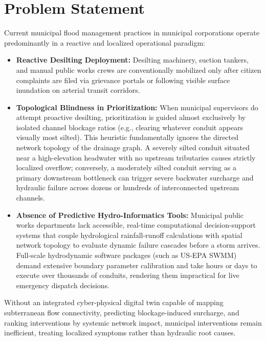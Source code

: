 \documentclass[12pt,a4paper]{report}
\begin{document}
\section{Problem Statement}
Current municipal flood management practices in municipal corporations operate predominantly in a reactive and localized operational paradigm:
\begin{itemize}
    \item \textbf{Reactive Desilting Deployment:} Desilting machinery, suction tankers, and manual public works crews are conventionally mobilized only after citizen complaints are filed via grievance portals or following visible surface inundation on arterial transit corridors.
    \item \textbf{Topological Blindness in Prioritization:} When municipal supervisors do attempt proactive desilting, prioritization is guided almost exclusively by isolated channel blockage ratios (e.g., clearing whatever conduit appears visually most silted). This heuristic fundamentally ignores the directed network topology of the drainage graph. A severely silted conduit situated near a high-elevation headwater with no upstream tributaries causes strictly localized overflow; conversely, a moderately silted conduit serving as a primary downstream bottleneck can trigger severe backwater surcharge and hydraulic failure across dozens or hundreds of interconnected upstream channels.
    \item \textbf{Absence of Predictive Hydro-Informatics Tools:} Municipal public works departments lack accessible, real-time computational decision-support systems that couple hydrological rainfall-runoff calculations with spatial network topology to evaluate dynamic failure cascades before a storm arrives. Full-scale hydrodynamic software packages (such as US-EPA SWMM) demand extensive boundary parameter calibration and take hours or days to execute over thousands of conduits, rendering them impractical for live emergency dispatch decisions.
\end{itemize}

Without an integrated cyber-physical digital twin capable of mapping subterranean flow connectivity, predicting blockage-induced surcharge, and ranking interventions by systemic network impact, municipal interventions remain inefficient, treating localized symptoms rather than hydraulic root causes.
\end{document}
